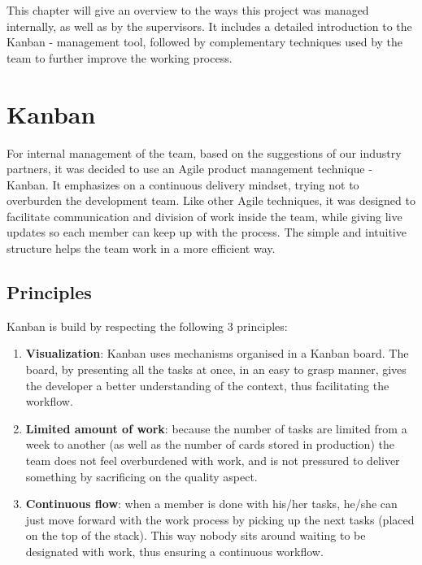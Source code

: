    This chapter will give an overview to the ways this project was managed internally, as well as by the supervisors. It includes a detailed introduction to the Kanban - management tool, followed by complementary techniques used by the team to further improve the working process.
    \section{Kanban}
For internal management of the team, based on the suggestions of our industry partners, it was decided to use an Agile product management technique - Kanban. It emphasizes on a continuous delivery mindset, trying not to overburden the development team. Like other Agile techniques, it was designed to facilitate communication and division of work inside the team, while giving live updates so each member can keep up with the process. The simple and intuitive structure helps the team work in a more efficient way.
        \subsection{Principles}
        Kanban is build by respecting the following 3 principles:
            \begin{enumerate}
  \item \textbf{Visualization}: Kanban uses mechanisms organised in a Kanban board. The board, by presenting all the tasks at once, in an easy to grasp manner, gives the developer a better understanding of the context, thus facilitating the workflow.
  \item \textbf{Limited amount of work}: because the number of tasks are limited from a week to another (as well as the number of cards stored in production) the team does not feel overburdened with work, and is not pressured to deliver something by sacrificing on the quality aspect.
  \item \textbf{Continuous flow}: when a member is done with his/her tasks, he/she can just move forward with the work process by picking up the next tasks (placed on the top of the stack). This way nobody sits around waiting to be designated with work, thus ensuring a continuous workflow.
\end{enumerate}
